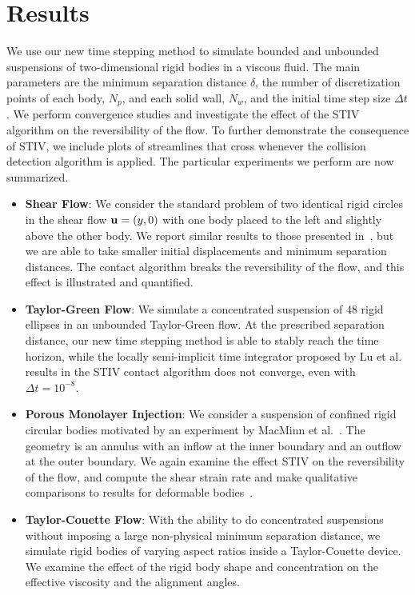 \documentclass[AMA,STIX1COL]{WileyNJD-v2}
\begin{document}
\section{Results}\label{s:results}
We use our new time stepping method to simulate bounded and unbounded
suspensions of two-dimensional rigid bodies in a viscous fluid.  The
main parameters are the minimum separation distance $\delta$, the number
of discretization points of each body, $N_p$, and each solid wall,
$N_w$, and the initial time step size $\Delta t$. We perform convergence
studies and investigate the effect of the STIV algorithm on the
reversibility of the flow.  To further demonstrate the consequence of
STIV, we include plots of streamlines that cross whenever the collision
detection algorithm is applied.  The particular experiments we perform
are now summarized.
\begin{itemize}
  \item {\bf Shear Flow}: We consider the standard problem of two
  identical rigid circles in the shear flow ${\mathbf{u}} = (y,0)$ with one body
  placed to the left and slightly above the other body.  We report
  similar results to those presented in~\cite{Lu2017}, but we are able
  to take smaller initial displacements and minimum separation
  distances.  The contact algorithm breaks the reversibility of the
  flow, and this effect is illustrated and quantified.

  \item {\bf Taylor-Green Flow}: We simulate a concentrated suspension
  of 48 rigid ellipses in an unbounded Taylor-Green flow. At the
  prescribed separation distance, our new time stepping method is able
  to stably reach the time horizon, while the locally semi-implicit time
  integrator proposed by Lu et al.~\cite{Lu2017} results in the STIV
  contact algorithm does not converge, even with $\Delta t = 10^{-8}$.

  \item {\bf Porous Monolayer Injection}: We consider a suspension of
  confined rigid circular bodies motivated by an experiment by MacMinn
  et al.~\cite{MacMinn2015}.  The geometry is an annulus with an inflow
  at the inner boundary and an outflow at the outer boundary.  We again
  examine the effect STIV on the reversibility of the flow, and compute
  the shear strain rate and make qualitative comparisons to results for
  deformable bodies~\cite{MacMinn2015}.

  \item {\bf Taylor-Couette Flow}: With the ability to do concentrated
  suspensions without imposing a large non-physical minimum separation
  distance, we simulate rigid bodies of varying aspect ratios inside a
  Taylor-Couette device.  We examine the effect of the rigid body shape
  and concentration on the effective viscosity and the alignment angles.
\end{itemize}
\end{document}
